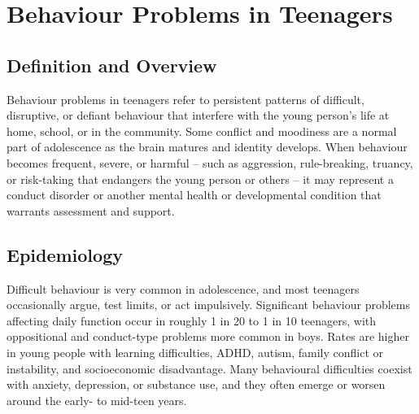 \chapter{Behaviour Problems in Teenagers}

\section*{Definition and Overview}
Behaviour problems in teenagers refer to persistent patterns of difficult, disruptive, or defiant behaviour that interfere with the young person's life at home, school, or in the community. Some conflict and moodiness are a normal part of adolescence as the brain matures and identity develops. When behaviour becomes frequent, severe, or harmful -- such as aggression, rule-breaking, truancy, or risk-taking that endangers the young person or others -- it may represent a conduct disorder or another mental health or developmental condition that warrants assessment and support.

\section*{Epidemiology}
Difficult behaviour is very common in adolescence, and most teenagers occasionally argue, test limits, or act impulsively. Significant behaviour problems affecting daily function occur in roughly 1 in 20 to 1 in 10 teenagers, with oppositional and conduct-type problems more common in boys. Rates are higher in young people with learning difficulties, ADHD, autism, family conflict or instability, and socioeconomic disadvantage. Many behavioural difficulties coexist with anxiety, depression, or substance use, and they often emerge or worsen around the early- to mid-teen years.

